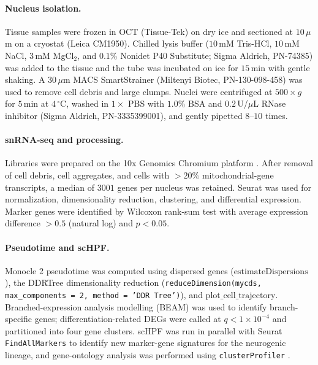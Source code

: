 \documentclass[11pt]{article}
\begin{document}
\paragraph{Nucleus isolation.} Tissue samples were frozen in OCT (Tissue-Tek) on dry ice and sectioned at $10\,\mu$m on a cryostat (Leica CM1950). Chilled lysis buffer ($10$\,mM Tris-HCl, $10$\,mM NaCl, $3$\,mM MgCl$_2$, and $0.1\%$ Nonidet P40 Substitute; Sigma Aldrich, PN-74385) was added to the tissue and the tube was incubated on ice for $15$\,min with gentle shaking. A $30\,\mu$m MACS SmartStrainer (Miltenyi Biotec, PN-130-098-458) was used to remove cell debris and large clumps. Nuclei were centrifuged at $500{\times}g$ for $5$\,min at $4\,^\circ$C, washed in $1\times$ PBS with $1.0\%$ BSA and $0.2$\,U/$\mu$L RNase inhibitor (Sigma Aldrich, PN-3335399001), and gently pipetted $8$--$10$ times.

\paragraph{snRNA-seq and processing.} Libraries were prepared on the 10x Genomics Chromium platform \cite{zheng201710x}. After removal of cell debris, cell aggregates, and cells with $>20\%$ mitochondrial-gene transcripts, a median of $3001$ genes per nucleus was retained. Seurat \cite{stuart2019seurat3,butler2018seurat,hao2021sc} was used for normalization, dimensionality reduction, clustering, and differential expression. Marker genes were identified by Wilcoxon rank-sum test with average expression difference $>0.5$ (natural log) and $p < 0.05$.

\paragraph{Pseudotime and scHPF.} Monocle 2 \cite{trapnell2014monocle,qiu2017monocle2} pseudotime was computed using dispersed genes ($\mathrm{estimateDispersions}$), the DDRTree dimensionality reduction (\texttt{reduceDimension(mycds, max\_components = 2, method = 'DDR Tree')}), and $\mathrm{plot\_cell\_trajectory}$. Branched-expression analysis modelling (BEAM) was used to identify branch-specific genes; differentiation-related DEGs were called at $q < 1 \times 10^{-4}$ and partitioned into four gene clusters. scHPF \cite{levitin2019schpf} was run in parallel with Seurat \texttt{FindAllMarkers} to identify new marker-gene signatures for the neurogenic lineage, and gene-ontology analysis was performed using \texttt{clusterProfiler} \cite{yu2012clusterprofiler}.
\end{document}
